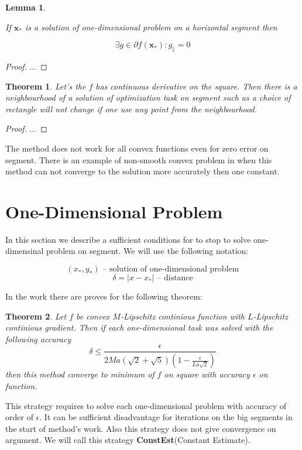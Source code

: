 \documentclass[12pt]{article}
\newtheorem{theorem}{Theorem}[section]
\newtheorem{lemma}{Lemma}[section]
\begin{document}
\begin{lemma}
\label{subgradient}

If $\textbf{x}_*$ is a solution of one-dimensional problem on a horizontal segment then

$$\exists g \in \partial f(\textbf{x}_*) : g_\parallel = 0$$
\end{lemma}
\begin{proof}
...
\end{proof}

\begin{theorem}
Let's the $f$ has continuous derivative on the square. Then there is a neighbourhood of a solution of optimization task on segment such as a choice of rectangle will not change if one use any point from the   neighbourhood.
\end{theorem}
\begin{proof}
...
\end{proof}

The method does not work for all convex functions even for zero error on segment. There is an example of non-smooth convex problem in \cite{Ston_Pas} when this method can not converge to the solution more accurately then one constant.

\section{One-Dimensional Problem}
\label{Delta}

In this section we describe a sufficient conditions for to stop to solve one-dimensinal problem on segment. We will use the following notation:

$$(x_*,y_*)\text{ -- solution of one-dimensional problem} $$
$$\delta = |x-x_*| \text{ -- distance}$$

In the work \cite{Ston_Pas} there are proves for the following theorem:

\begin{theorem}
\label{ConstEst}
Let $f$ be convex $M$-Lipschitz continious function with $L$-Lipschitz continious gradient.
Then if each one-dimensional task was solved with the following accuracy
\begin{equation}
\delta \leq \frac{\epsilon}{2Ma(\sqrt{2}+\sqrt{5})(1-\frac{\epsilon}{La\sqrt{2}})}
\end{equation}
then this method converge to minimum of $f$ on square with accuracy $\epsilon$ on function.
\end{theorem}

This strategy requires to solve each one-dimensional problem with accuracy of order of $\epsilon$. It can be sufficient disadvantage for iterations on the big segments in the start of method's work. Also this strategy does not give convergence on argument. We will call this strategy \textbf{ConstEst}(Constant Estimate).
\end{document}

